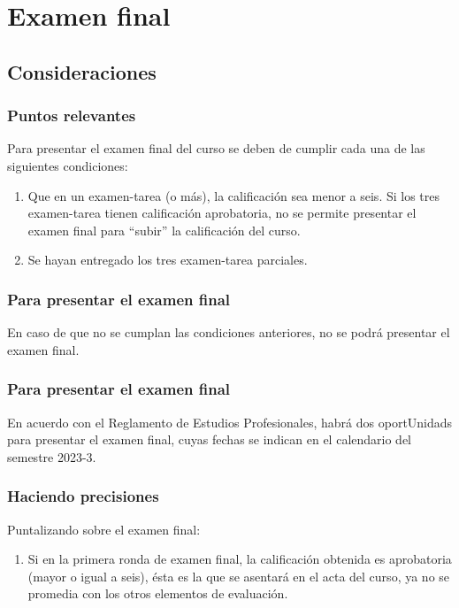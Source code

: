 \documentclass[12pt]{beamer}
\begin{document}
\section{Examen final}
\subsection{Consideraciones}

\begin{frame}
\frametitle{Puntos relevantes}
Para presentar el examen final del curso se deben de cumplir cada una de las siguientes condiciones:
\pause
{}
\begin{enumerate}[<+->]
\item Que en un examen-tarea (o más), la calificación sea menor a seis. Si los tres examen-tarea tienen calificación aprobatoria, no se permite presentar el examen final para \enquote{subir} la calificación del curso.
\item Se hayan entregado los tres examen-tarea parciales.
\end{enumerate}
\end{frame}
\begin{frame}
\frametitle{Para presentar el examen final}
En caso de que no se cumplan las condiciones anteriores, no se podrá presentar el examen final.
\end{frame}
\begin{frame}
\frametitle{Para presentar el examen final}
En acuerdo con el Reglamento de Estudios Profesionales, habrá dos oportUnidads para presentar el examen final, cuyas fechas se indican en el calendario del semestre 2023-3.
\end{frame}
\begin{frame}
\frametitle{Haciendo precisiones}
Puntalizando sobre el examen final:
\pause
{}
\begin{enumerate}[<+->]
\item Si en la primera ronda de examen final, la calificación obtenida es aprobatoria (mayor o igual a seis), ésta es la que se asentará en el acta del curso, ya no se promedia con los otros elementos de evaluación.
\seti
\end{enumerate}
\end{frame}
\end{document}
